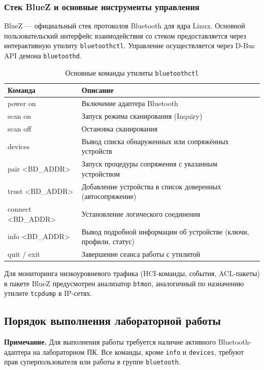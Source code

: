 \subsubsection{Стек BlueZ и основные инструменты управления}
BlueZ --- официальный стек протоколов Bluetooth для ядра Linux. Основной пользовательский интерфейс взаимодействия со стеком предоставляется через интерактивную утилиту \texttt{bluetoothctl}. Управление осуществляется через D-Bus API демона \texttt{bluetoothd}.

\begin{table}[htbp]
\centering
\caption{Основные команды утилиты \texttt{bluetoothctl}}
\label{tab:bluetoothctl}
\begin{tabularx}{\textwidth}{lX}
\toprule
\textbf{Команда} & \textbf{Описание} \\
\midrule
power on & Включение адаптера Bluetooth \\
scan on & Запуск режима сканирования (Inquiry) \\
scan off & Остановка сканирования \\
devices & Вывод списка обнаруженных или сопряжённых устройств \\
pair <BD\_ADDR> & Запуск процедуры сопряжения с указанным устройством \\
trust <BD\_ADDR> & Добавление устройства в список доверенных (автосопряжение) \\
connect <BD\_ADDR> & Установление логического соединения \\
info <BD\_ADDR> & Вывод подробной информации об устройстве (ключи, профили, статус) \\
quit / exit & Завершение сеанса работы с утилитой \\
\bottomrule
\end{tabularx}
\end{table}

Для мониторинга низкоуровневого трафика (HCI-команды, события, ACL-пакеты) в пакете BlueZ предусмотрен анализатор \texttt{btmon}, аналогичный по назначению утилите \texttt{tcpdump} в IP-сетях.

\subsection{Порядок выполнения лабораторной работы}
\textbf{Примечание.} Для выполнения работы требуется наличие активного Bluetooth-адаптера на лабораторном ПК. Все команды, кроме \texttt{info} и \texttt{devices}, требуют прав суперпользователя или работы в группе \texttt{bluetooth}.

